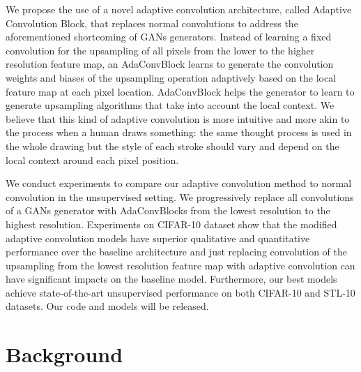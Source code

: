 \documentclass{article} %
\begin{document}
We propose the use of a novel adaptive convolution \citep{niklaus2017video} architecture, called Adaptive Convolution Block, that replaces normal convolutions to address the aforementioned shortcoming of GANs generators. Instead of learning a fixed convolution for the upsampling of all pixels from the lower to the higher resolution feature map, an AdaConvBlock learns to generate the convolution weights and biases of the upsampling operation adaptively based on the local feature map at each pixel location. AdaConvBlock helps the generator to learn to generate upsampling algorithms that take into account the local context. We believe that this kind of adaptive convolution is more intuitive and more akin to the process when a human draws something: the same thought process is used in the whole drawing but the style of each stroke should vary and depend on the local context around each pixel position. \par
We conduct experiments to compare our adaptive convolution method to normal convolution in the unsupervised setting. We progressively replace all convolutions of a GANs generator with AdaConvBlocks from the lowest resolution to the highest resolution. Experiments on CIFAR-10 dataset show that the modified adaptive convolution models have superior qualitative and quantitative performance over the baseline architecture and just replacing convolution of the upsampling from the lowest resolution feature map with adaptive convolution can have significant impacts on the baseline model. Furthermore, our best models achieve state-of-the-art unsupervised performance on both CIFAR-10 and STL-10 datasets. Our code and models will be released.

\section{Background}
\label{background}
\end{document}
